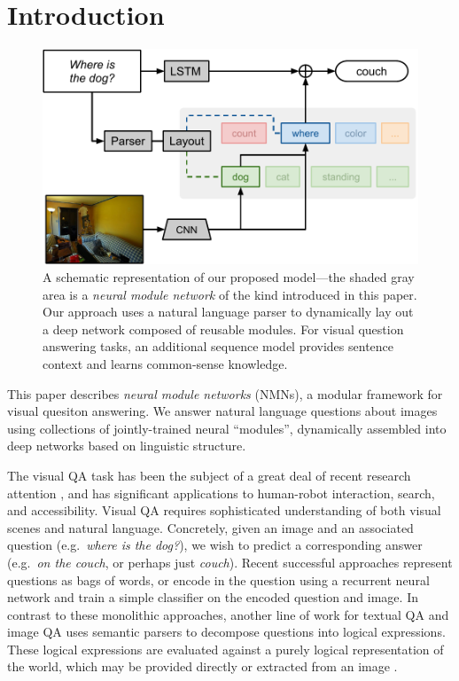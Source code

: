 \section{Introduction} 

\begin{figure}[t] \begin{center}
    \includegraphics[width=\linewidth]{fig/teaser} \end{center} \caption{
      A schematic representation of our proposed model---the shaded gray area is a
      {\it neural module network} of the kind introduced in this paper. Our
      approach uses a natural language parser to dynamically lay out a deep
      network composed of reusable modules. For visual question answering tasks,
      an additional sequence model provides sentence context and learns
      common-sense knowledge.
    } \label{fig:teaser}
\end{figure}

This paper describes \emph{neural module networks} (NMNs), a modular framework
for visual quesiton answering. We answer natural language questions about images
using collections of jointly-trained neural ``modules'', dynamically assembled
into deep networks based on linguistic structure. 

The visual QA task has been the subject of a great deal of recent research
attention
\cite{antol15iccv,gao2015you,ma15arxiv,malinowski15iccv,ren2015image,yu15arxiv},
and has significant applications to human-robot interaction, search, and
accessibility.  Visual QA requires sophisticated understanding of both visual
scenes and natural language.
%
Concretely, given an image and an associated question (e.g.\ \emph{where is
the dog?}), we wish to predict a corresponding answer (e.g.\ \emph{on the
couch}, or perhaps just \emph{couch}). Recent successful approaches represent
questions as bags of words, or encode in the question using a recurrent neural
network \cite{malinowski15iccv} and train a simple classifier on the encoded
question and image. In contrast to these monolithic approaches, another line of
work for textual QA \cite{Liang13DCS} and image QA \cite{malinowski14nips} uses
semantic parsers to decompose questions into logical expressions. These logical
expressions are evaluated against a purely logical representation of the world,
which may be provided directly or extracted from an image
\cite{Krish2013Grounded}.

